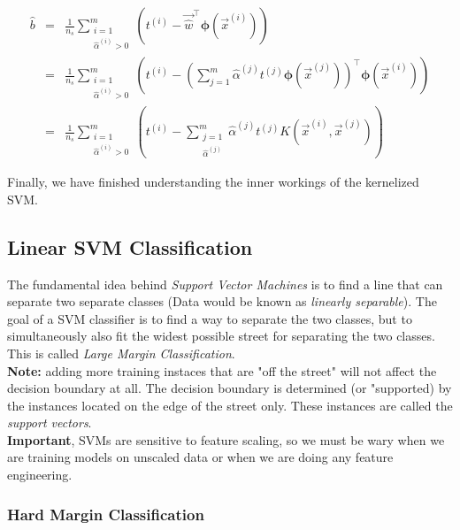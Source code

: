 \begin{eqnarray}
\hat{b} &=& \frac{1}{n_{s}} \sum_{\substack{i=1 \\ \hat{\alpha}^{(i)} > 0}}^{m} \left(t^{(i)} - \vec{\hat{w}}^{\intercal}\boldsymbol{\phi}\left(\vec{x}^{(i)}\right)\right) \nonumber \\
        &=& \frac{1}{n_{s}} \sum_{\substack{i=1 \\ \hat{\alpha}^{(i)} > 0}}^{m} \left(t^{(i)} - \left(\sum_{j=1}^{m} \hat{\alpha}^{(j)}t^{(j)}\boldsymbol{\phi}\left(\vec{x}^{(j)}\right)\right)^{\intercal} \boldsymbol{\phi}\left(\vec{x}^{(i)}\right)\right) \nonumber \\
        &=& \frac{1}{n_{s}} \sum_{\substack{i=1 \\ \hat{\alpha}^{(i)} > 0}}^{m} \left(t^{(i)} - \sum_{\substack{j=1 \\ \hat{\alpha}^{(j)}}}^{m} \hat{\alpha}^{(j)}t^{(j)} K\left(\vec{x}^{(i)}, \vec{x}^{(j)}\right)\right) \nonumber
\end{eqnarray}

\noindent
Finally, we have finished understanding the inner workings of the kernelized SVM. 

\subsection{Linear SVM Classification}
The fundamental idea behind \textit{Support Vector Machines} is to find a line that can separate two separate 
classes (Data would be known as \textit{linearly separable}). The goal of a SVM classifier is to find a way to 
separate the two classes, but to simultaneously also fit the widest possible street for separating the two 
classes. This is called \textit{Large Margin Classification}.\\

\noindent
\textbf{Note:} adding more training instaces that are "off the street" will not affect the decision boundary at
all. The decision boundary is determined (or "supported) by the instances located on the edge of the street only. 
These instances are called the \textit{support vectors}. \\ 

\noindent
\textbf{Important}, SVMs are sensitive to feature scaling, so we must be wary when we are training models on 
unscaled data or when we are doing any feature engineering.

\subsubsection{Hard Margin Classification}

